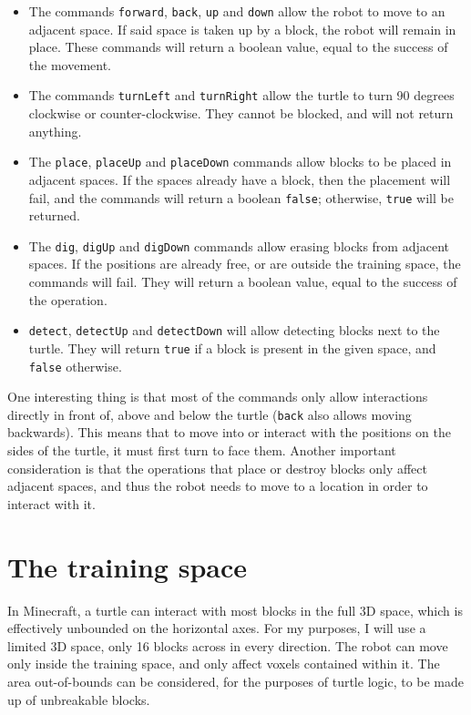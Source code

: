 \documentclass{report}
\begin{document}
\begin{itemize}
    \item The commands \texttt{forward}, \texttt{back}, \texttt{up} and \texttt{down} allow the robot to move to an adjacent space. If said space is taken up by a block, the robot will remain in place. These commands will return a boolean value, equal to the success of the movement.
    \item The commands \texttt{turnLeft} and \texttt{turnRight} allow the turtle to turn 90 degrees clockwise or counter-clockwise. They cannot be blocked, and will not return anything.
    \item The \texttt{place}, \texttt{placeUp} and \texttt{placeDown} commands allow blocks to be placed in adjacent spaces. If the spaces already have a block, then the placement will fail, and the commands will return a boolean \texttt{false}; otherwise, \texttt{true} will be returned.
    \item The \texttt{dig}, \texttt{digUp} and \texttt{digDown} commands allow erasing blocks from adjacent spaces. If the positions are already free, or are outside the training space, the commands will fail. They will return a boolean value, equal to the success of the operation.
    \item \texttt{detect}, \texttt{detectUp} and \texttt{detectDown} will allow detecting blocks next to the turtle. They will return \texttt{true} if a block is present in the given space, and \texttt{false} otherwise.
\end{itemize}

One interesting thing is that most of the commands only allow interactions directly in front of, above and below the turtle (\texttt{back} also allows moving backwards). This means that to move into or interact with the positions on the sides of the turtle, it must first turn to face them. Another important consideration is that the operations that place or destroy blocks only affect adjacent spaces, and thus the robot needs to move to a location in order to interact with it.

\section{The training space}

In Minecraft, a turtle can interact with most blocks in the full 3D space, which is effectively unbounded on the horizontal axes. For my purposes, I will use a limited 3D space, only 16 blocks across in every direction. The robot can move only inside the training space, and only affect voxels contained within it. The area out-of-bounds can be considered, for the purposes of turtle logic, to be made up of unbreakable blocks.
\end{document}
